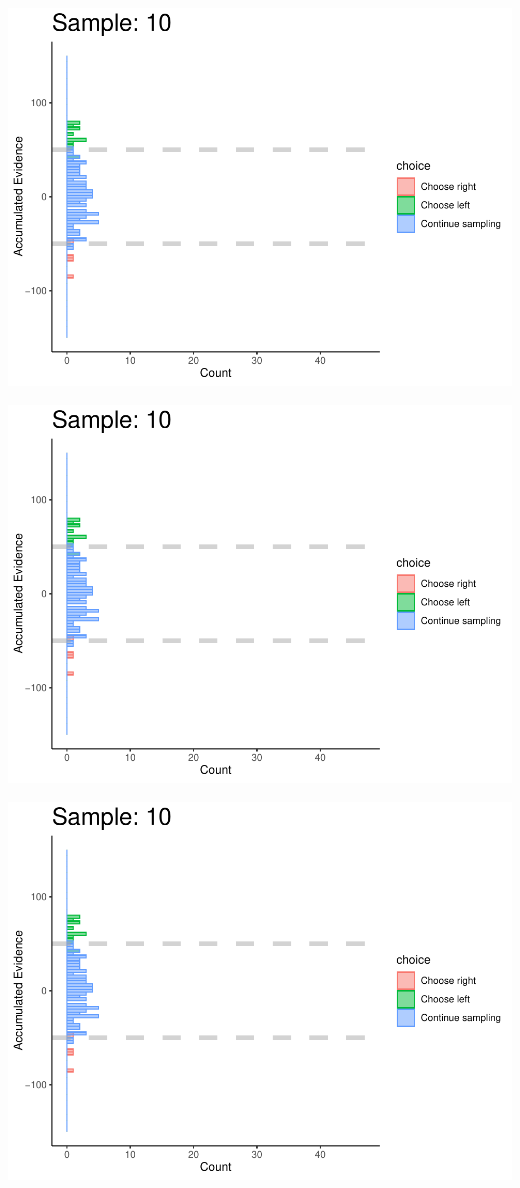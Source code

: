 \documentclass[
]{book}
\begin{document}
\begin{center}\includegraphics[width=0.8\linewidth]{LateNightBayes_files/figure-latex/fixed_check-91} \end{center}

\begin{center}\includegraphics[width=0.8\linewidth]{LateNightBayes_files/figure-latex/fixed_check-92} \end{center}

\begin{center}\includegraphics[width=0.8\linewidth]{LateNightBayes_files/figure-latex/fixed_check-93} \end{center}
\end{document}
